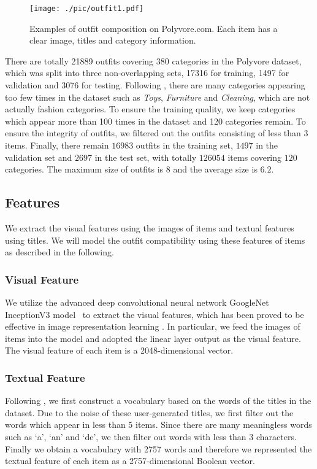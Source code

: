 \documentclass[sigconf]{acmart}
\begin{document}
\begin{figure}[t]
  \centering
\texttt{[image: ./pic/outfit1.pdf]}
  \caption{Examples of outfit composition on Polyvore.com. Each item has a clear image, titles and category information.}\label{fig:outfit_example}
\end{figure}


There are totally 21889 outfits covering 380 categories in the Polyvore dataset, which was split into three non-overlapping sets, 17316 for training, 1497 for validation and 3076 for testing.
Following \cite{song2017neurostylist},
there are many categories appearing too few times in the dataset such as \emph{Toys}, \emph{Furniture} and \emph{Cleaning}, which are not actually fashion categories. To ensure the training quality, we keep categories which appear more than 100 times in the dataset and 120 categories remain.
To ensure the integrity of outfits, we filtered out the outfits consisting of less than $3$ items.
Finally, there remain $16983$ outfits in the training set, $1497$ in the validation set and $2697$ in the test set, with totally $126054$ items covering $120$ categories. The maximum size of outfits is $8$ and the average size is $6.2$.


\subsection{Features} \label{sect:feature}
We extract the visual features using the images of items and textual features using titles. We will model the outfit compatibility using these features of items as described in the following.

\subsubsection{Visual Feature}
We utilize the advanced deep convolutional neural network GoogleNet InceptionV3 model~\cite{szegedy2016rethinking} to extract the visual features, which has been proved to be effective in image representation learning \cite{han2017learning,lee2017style2vec,sharif2014cnn,donahue2014decaf}.
In particular, we feed the images of items into the model and adopted the linear layer output as the visual feature. The visual feature of each item is a 2048-dimensional vector.

\subsubsection{Textual Feature}
Following \cite{song2017neurostylist}, we first construct a vocabulary based on the words of the titles in the dataset.
 Due to the noise of these user-generated titles, we first filter out the words which appear in less than 5 items. Since there are many meaningless words such as `a', `an' and `de', we then filter out words with less than 3 characters.
Finally we obtain a vocabulary with 2757 words and therefore we represented the textual feature of each item as a 2757-dimensional Boolean vector.
\end{document}
